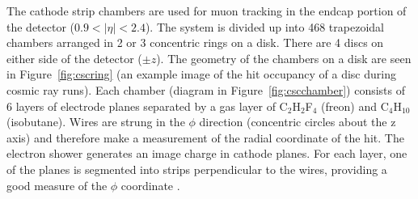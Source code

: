The cathode strip chambers are used for muon tracking in the endcap portion of the detector ($0.9<|\eta|<2.4$). The system is divided up into 468 trapezoidal chambers arranged in 2 or 3 concentric rings on a disk. There are 4 discs on either side of the detector ($\pm z$). The geometry of the chambers on a disk are seen in Figure~\ref{fig:cscring} (an example image of the hit occupancy of a disc during cosmic ray runs). Each chamber (diagram in Figure~\ref{fig:cscchamber}) consists of 6 layers of electrode planes separated by a gas layer of C$_{2}$H$_{2}$F$_{4}$ (freon) and C$_{4}$H$_{10}$ (isobutane). Wires are strung in the $\phi$ direction (concentric circles about the z axis) and therefore make a measurement of the radial coordinate of the hit. The electron shower generates an image charge in cathode planes. For each layer, one of the planes is segmented into strips perpendicular to the wires, providing a good measure of the $\phi$ coordinate \cite{cscperformance}.

